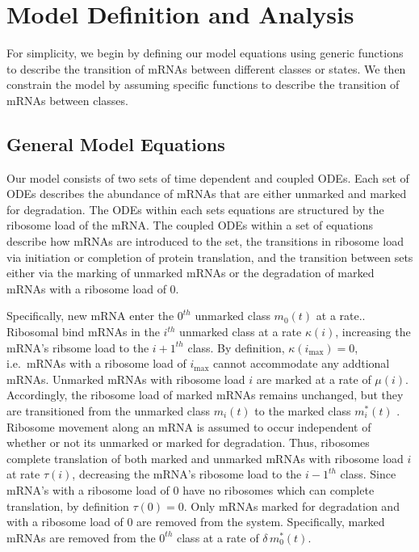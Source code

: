 \documentclass[review]{elsarticle}
\newcommand{\imax}{\ensuremath{i_{\max}}\xspace}
\begin{document}
\section{Model Definition and Analysis}
For simplicity, we begin by defining our model equations using generic functions to describe the transition of mRNAs between different classes or states.
We then constrain the model by assuming specific functions to describe the transition of mRNAs between classes.

\subsection*{General Model Equations}
Our model consists of two sets of time dependent and coupled ODEs.
Each set of ODEs describes the abundance of mRNAs that are either unmarked and marked for degradation.
The ODEs within each sets equations are structured by the ribosome load of the mRNA.
The coupled ODEs within a set of equations describe how mRNAs are introduced to the set, the transitions in ribosome load via initiation or completion of protein translation,  and the transition between sets either via the marking of unmarked mRNAs or the degradation of marked mRNAs with a ribosome load of 0.

Specifically, new mRNA enter the $0^{th}$ unmarked class $m_0(t)$ at a rate..
Ribosomal bind mRNAs in the $i^{th}$ unmarked class at a rate $\kappa(i)$, increasing the mRNA's ribsome load to the $i+1^{th}$ class.
By definition, $\kappa(\imax)= 0$, i.e.~mRNAs with a ribosome load of \imax cannot accommodate any addtional mRNAs.
Unmarked mRNAs with ribosome load $i$ are marked at a rate of $\mu(i)$.
Accordingly, the ribosome load of marked mRNAs remains unchanged, but they are transitioned from the unmarked class $m_i(t)$ to the marked class $m_i^*(t)$ .
Ribosome movement along an mRNA is assumed to occur independent of whether or not its unmarked or marked for degradation.
Thus, ribosomes complete translation of both marked and unmarked mRNAs with ribosome load $i$ at rate $\tau(i)$, decreasing the mRNA's ribosome load to the $i-1^{th}$ class. %
Since mRNA's with a ribosome load of 0 have no ribosomes which can complete translation, by definition $\tau(0) = 0$.
Only mRNAs marked for degradation and with a ribosome load of 0 are removed from the system.
Specifically, marked mRNAs are removed from the $0^{th}$ class at a rate of $\delta \, m^*_0(t)$.
\end{document}
